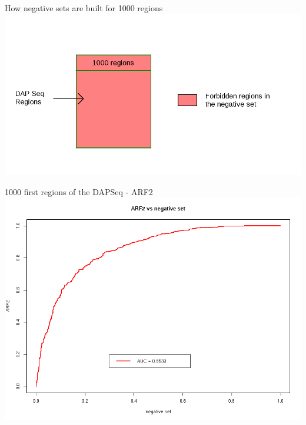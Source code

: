 \documentclass{beamer}
\begin{document}
\begin{frame}{How negative sets are built for 1000 regions}
  \includegraphics[width=1\textwidth,height=0.8\textheight,center]{negative_set_all_regions.png}
\end{frame}

\begin{frame}{1000 first regions of the DAPSeq - ARF2}
  \includegraphics[width=1\textwidth,height=0.8\textheight,center]{ROC_ARF2_negative_set_all_regions.png}
\end{frame}
\end{document}
